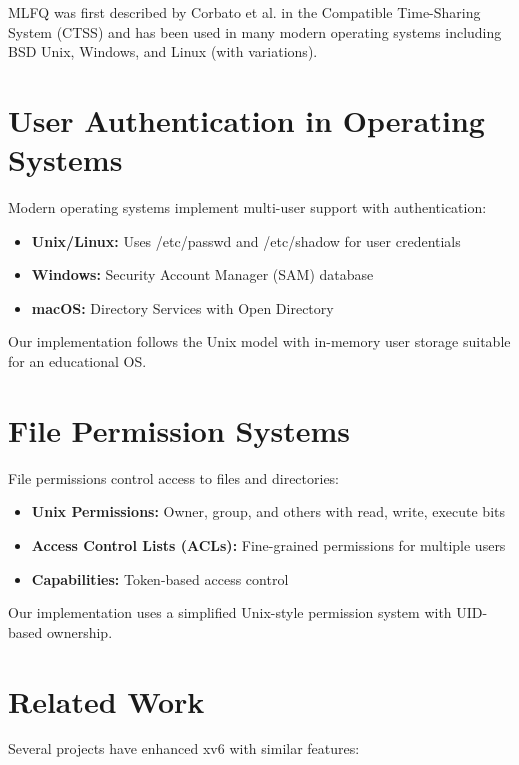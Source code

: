 \documentclass[a4paper,12pt]{report}
\begin{document}
MLFQ was first described by Corbato et al. in the Compatible Time-Sharing System (CTSS) and has been used in many modern operating systems including BSD Unix, Windows, and Linux (with variations).

\section{User Authentication in Operating Systems}

Modern operating systems implement multi-user support with authentication:

\begin{itemize}
    \item \textbf{Unix/Linux:} Uses /etc/passwd and /etc/shadow for user credentials
    \item \textbf{Windows:} Security Account Manager (SAM) database
    \item \textbf{macOS:} Directory Services with Open Directory
\end{itemize}

Our implementation follows the Unix model with in-memory user storage suitable for an educational OS.

\section{File Permission Systems}

File permissions control access to files and directories:

\begin{itemize}
    \item \textbf{Unix Permissions:} Owner, group, and others with read, write, execute bits
    \item \textbf{Access Control Lists (ACLs):} Fine-grained permissions for multiple users
    \item \textbf{Capabilities:} Token-based access control
\end{itemize}

Our implementation uses a simplified Unix-style permission system with UID-based ownership.

\section{Related Work}

Several projects have enhanced xv6 with similar features:
\end{document}
